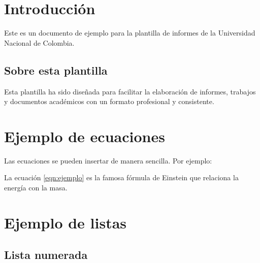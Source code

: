 %
%

\section{Introducción}

	Este es un documento de ejemplo para la plantilla de informes de la Universidad Nacional de Colombia.

	\subsection{Sobre esta plantilla}

	Esta plantilla ha sido diseñada para facilitar la elaboración de informes, trabajos y documentos académicos con un formato profesional y consistente.

\section{Ejemplo de ecuaciones}

	Las ecuaciones se pueden insertar de manera sencilla. Por ejemplo:

	\insertequation[\label{eqn:ejemplo}]{E = mc^2}

	La ecuación \eqref{eqn:ejemplo} es la famosa fórmula de Einstein que relaciona la energía con la masa.

\section{Ejemplo de listas}

	\subsection{Lista numerada}

